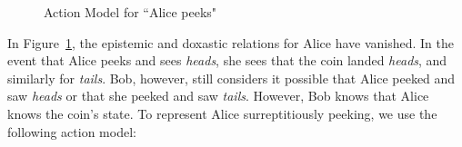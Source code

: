 \begin{figure}[H]
\begin{center}
\end{center}
\caption{Action Model for ``Alice peeks"}
\label{fig: peek}
\end{figure}

In Figure~\ref{fig: peek}, the epistemic and doxastic relations for Alice have vanished. In the event that Alice peeks and sees \emph{heads}, she sees that the coin landed \emph{heads}, and similarly for \emph{tails}. Bob, however, still considers it possible that Alice peeked and saw \emph{heads} or that she peeked and saw \emph{tails}. However, Bob knows that Alice knows the coin's state. To represent Alice surreptitiously peeking, we use the following action model:
 
